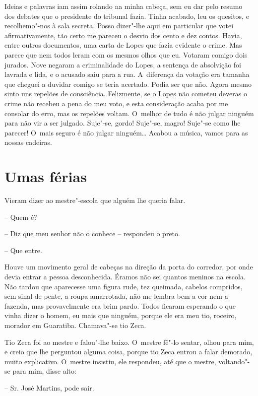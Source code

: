 Ideias e palavras iam assim rolando na minha cabeça, sem eu dar pelo
resumo dos debates que o presidente do tribunal fazia. Tinha acabado,
leu os quesitos, e recolhemo"-nos à sala secreta. Posso dizer"-lhe aqui em
particular que votei afirmativamente, tão certo me pareceu o desvio dos
cento e dez contos. Havia, entre outros documentos, uma carta de Lopes
que fazia evidente o crime. Mas parece que nem todos leram com os mesmos
olhos que eu. Votaram comigo dois jurados. Nove negaram a criminalidade
do Lopes, a sentença de absolvição foi lavrada e lida, e o acusado saiu
para a rua. A~diferença da votação era tamanha que cheguei a duvidar
comigo se teria acertado. Podia ser que não. Agora mesmo sinto uns
repelões de consciência. Felizmente, se o Lopes não cometeu deveras o
crime não recebeu a pena do meu voto, e esta consideração acaba por me
consolar do erro, mas os repelões voltam. O~melhor de tudo é não julgar
ninguém para não vir a ser julgado. Suje"-se, gordo! Suje"-se, magro!
Suje"-se como lhe parecer! O~mais seguro é não julgar ninguém\ldots{} Acabou a
música, vamos para as nossas cadeiras.

\chapter{Umas férias}

Vieram dizer ao mestre"-escola que alguém lhe queria falar.

-- Quem é?

-- Diz que meu senhor não o conhece -- respondeu o preto.

-- Que entre.

Houve um movimento geral de cabeças na direção da porta do corredor, por
onde devia entrar a pessoa desconhecida. Éramos não sei quantos meninos
na escola. Não tardou que aparecesse uma figura rude, tez queimada,
cabelos compridos, sem sinal de pente, a roupa amarrotada, não me lembra
bem a cor nem a fazenda, mas provavelmente era brim pardo. Todos ficaram
esperando o que vinha dizer o homem, eu mais que ninguém, porque ele era
meu tio, roceiro, morador em Guaratiba. Chamava"-se tio Zeca.

Tio Zeca foi ao mestre e falou"-lhe baixo. O~mestre fê"-lo sentar, olhou
para mim, e creio que lhe perguntou alguma coisa, porque tio Zeca entrou
a falar demorado, muito explicativo. O~mestre insistiu, ele respondeu,
até que o mestre, voltando"-se para mim, disse alto:

-- Sr. José Martins, pode sair.

